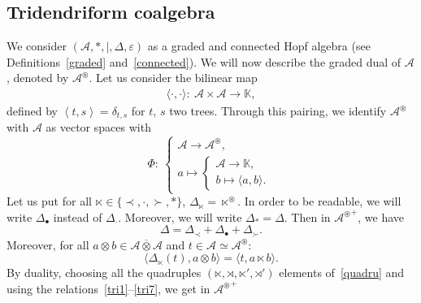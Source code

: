 \documentclass[pdftex]{sigma}
\numberwithin{equation}{section}
\theoremstyle{definition}
\theoremstyle{plain}
\newcommand{\K}{\mathbb{K}}
\begin{document}
\subsection{Tridendriform coalgebra}
We consider $(\mathcal{A},*,|,\Delta,\varepsilon)$ as a graded and connected Hopf algebra (see Definitions~\ref{graded} and~\ref{connected}).
We will now describe the graded dual of $\mathcal{A}$, denoted by $\mathcal{A}^{\circledast}$. Let us consider the bilinear map
\begin{gather*}
	\langle \cdot,\cdot \rangle \colon \
		\mathcal{A}\times \mathcal{A} \rightarrow \K,
\end{gather*}
 defined by $\left\langle t,s \right\rangle=\delta_{t,s}$ for $t$, $s$ two trees. Through this pairing, we identify $\mathcal{A}^{\circledast}$ with $\mathcal{A}$ as vector spaces with
\begin{equation}\label{eq:pairing}
	\Phi\colon \ \begin{cases}
		\mathcal{A} \rightarrow \mathcal{A}^{\circledast}, \\
		a \mapsto \begin{cases}
			\mathcal{A} \rightarrow \K, \\
			b \mapsto \langle a,b \rangle.
		\end{cases}
	\end{cases}
\end{equation}
Let us put for all $\ltimes\in\{\prec,\cdot,\succ,*\}$, $\Delta_{\ltimes}={\ltimes}^{\circledast}.$
In order to be readable, we will write $\Delta_{\bullet}$ instead of $\Delta_{\cdot}$. Moreover, we will write $\Delta_*=\Delta$. Then in ${\mathcal{A}^{\circledast}}^+$, we have
\[
\Delta=\Delta_{\prec}+\Delta_{\bullet}+\Delta_{\succ}.
\]
Moreover, for all $a\otimes b\in \mathcal{A}\overline{\otimes} \mathcal{A}$ and $t\in \mathcal{A}\simeq \mathcal{A}^{\circledast}$:
\[
 \langle \Delta_{\ltimes}(t),a\otimes b \rangle= \langle t,a\ltimes b \rangle.
\]
By duality, choosing all the quadruples $(\ltimes,\rtimes,\ltimes',\rtimes')$ elements of~\eqref{quadru} and using the relations~\eqref{tri1}--\eqref{tri7}, we get in ${\mathcal{A}^{\circledast}}^+$
\end{document}
